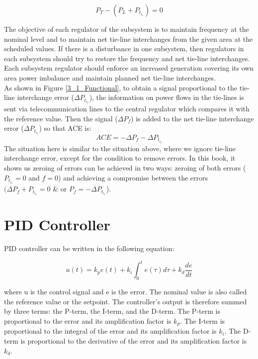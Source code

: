 \documentclass{report}
\begin{document}
\begin{equation} \label{eq1}
 P_T - (P_L + P_t_i_e) = 0
\end{equation}

The objective of each regulator of the subsystem is to maintain frequency at the nominal level and to maintain net tie-line interchanges from the given area at the scheduled values. If there is a disturbance in one subsystem, then regulators in each subsystem should try to restore the frequency and net tie-line interchanges. Each subsystem regulator should enforce an increased generation covering its own area power imbalance and maintain planned net tie-line interchanges.\\

As shown in Figure \textcolor{red}{\ref{3_1_Functional}}, to obtain a signal proportional to the tie-line interchange error ($\Delta P_t_i_e$), the information on power ﬂows in the tie-lines is sent via telecommunication lines to the central regulator which compares it with the reference value. Then the signal ($\Delta P_f$) is added to the net tie-line interchange error ($\Delta P_t_i_e$) so that ACE is: \\
\begin{equation} \label{eq2}
 ACE = −\Delta P_f − \Delta P_t_i_e 
\end{equation}
The situation here is similar to the situation above, where we ignore tie-line interchange error, except for the condition to remove errors. In this book, it shows us zeroing of errors can be achieved in two ways: zeroing of both errors ($ P_t_i_e = 0 $ and $ f = 0 $) and achieving a compromise between the errors $(\Delta P_f + P_t_i_e = 0 $ & or $ P_f = - \Delta P_t_i_e $).\\



\section{PID Controller} %
PID controller can be written in the following equation:

\begin{equation} \label{eq3}
 u(t) = k_p e(t) + k_i \int_{0}^{t} e(\tau) d\tau + k_d \frac{d e}{d t}
\end{equation}

 where u is the control signal and e is the error. The nominal value is also called the reference value or the setpoint. The controller’s output is therefore summed by three terms: the P-term, the I-term, and the D-term. The P-term is proportional to the error and its amplification factor is $k_p$. The I-term is proportional to the integral of the error and its amplification factor is $k_i$. The D-term is proportional to the derivative of the error and its amplification factor is $k_d$.\\
 
\end{document}
